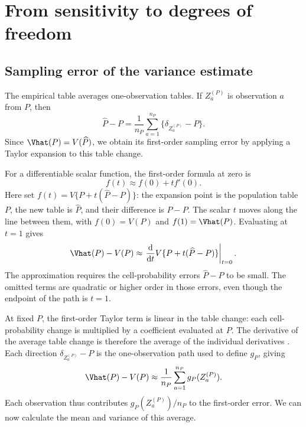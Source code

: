 \section{From sensitivity to degrees of freedom}
\label{sec:component-df}

\subsection{Sampling error of the variance estimate}

The empirical table averages one-observation tables. If
\(Z_a^{(P)}\) is observation \(a\) from \(P\), then
\begin{equation}
  \widehat P-P
  =\frac{1}{n_P}\sum_{a=1}^{n_P}
    \{\delta_{Z_a^{(P)}}-P\}.
\end{equation}
Since \(\Vhat(P)=V(\widehat P)\), we obtain its first-order sampling
error by applying a Taylor expansion to this table change.

For a differentiable scalar function, the first-order formula at zero is
\begin{equation*}
  f(t)\approx f(0)+t f'(0).
\end{equation*}
Here set \(f(t)=V\{P+t(\widehat P-P)\}\): the expansion point is
the population table \(P\), the new table is \(\widehat P\), and
their difference is \(\widehat P-P\). The scalar \(t\) moves along
the line between them, with \(f(0)=V(P)\) and
\(f(1)=\Vhat(P)\). Evaluating at \(t=1\) gives
\begin{equation*}
  \Vhat(P)-V(P)
  \approx\left.\frac{\mathrm d}{\mathrm dt}
    V\{P+t(\widehat P-P)\}\right|_{t=0}.
\end{equation*}
The approximation requires the cell-probability errors
\(\widehat P-P\) to be small. The omitted terms are quadratic or
higher order in those errors, even though the endpoint of the path is
\(t=1\).

At fixed \(P\), the first-order Taylor term is linear in the table
change: each cell-probability change is multiplied by a coefficient
evaluated at \(P\). The derivative of the average table change is
therefore the average of the individual derivatives
\citep[Chapter~20]{vanderVaart1998}. Each direction
\(\delta_{Z_a^{(P)}}-P\) is the one-observation path used to define
\(g_P\), giving
\begin{equation}
  \Vhat(P)-V(P)
  \approx\frac{1}{n_P}\sum_{a=1}^{n_P}g_P(Z_a^{(P)}).
  \label{eq:vhat-linearization}
\end{equation}
Each observation thus contributes \(g_P(Z_a^{(P)})/n_P\) to the
first-order error. We can now calculate the mean and variance of this
average.

